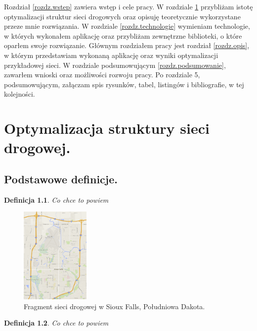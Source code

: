 \documentclass[twoside,12pt]{report}
\newtheorem{definition}{Definicja} %
\let\oldsection\chapter
\def\chapter{\cleardoublepage\oldsection}
\begin{document}
Rozdział \ref{rozdz.wstep} zawiera wstęp i cele pracy. W rozdziale \ref{rozdz.optymalizacja} przybliżam istotę optymalizacji struktur sieci drogowych
oraz opisuję teoretycznie wykorzystane przeze mnie rozwiązania. W rozdziale \ref{rozdz.technologie} wymieniam technologie, w których wykonałem aplikację oraz przybliżam zewnętrzne biblioteki, o które oparłem swoje rozwiązanie. Głównym rozdziałem pracy jest rozdział \ref{rozdz.opis},
w którym przedstawiam wykonaną aplikację oraz wyniki optymalizacji przykładowej sieci. W rozdziale podsumowującym \ref{rozdz.podsumowanie}, zawarłem wnioski oraz możliwości rozwoju pracy. Po rozdziale 5, podsumowującym, załączam spis rysunków, tabel, listingów i bibliografie, w tej kolejności.

\chapter{Optymalizacja struktury sieci drogowej.}\label{rozdz.optymalizacja} 
\section{Podstawowe definicje.}

\begin{definition}\label{Sieć drogowa}
Co chce to powiem
\end{definition}


\begin{figure}[ht]
\begin{center}
\includegraphics[width=0.30\textwidth]{img/siec}
\caption{Fragment sieci drogowej w Sioux Falls, Południowa Dakota.} 
\end{center}
\end{figure}


\begin{definition}\label{Sieć drogowa w postaci grafu}
Co chce to powiem
\end{definition}
\end{document}
